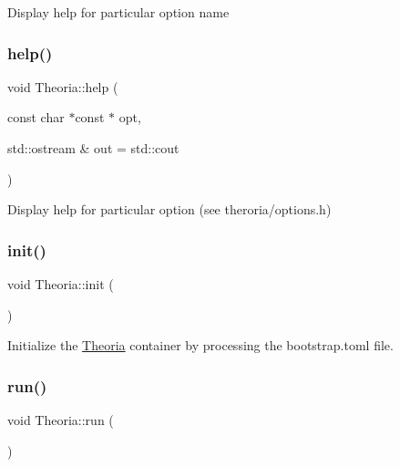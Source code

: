 Display help for particular option name \mbox{\label{classtheoria_1_1core_1_1Theoria_a6e8f92e0bc4cabe69a0675797d158b9f}} 
\subsubsection{\texorpdfstring{help()}{help()}\hspace{0.1cm}{\footnotesize\ttfamily [3/3]}}
{\footnotesize\ttfamily void Theoria\+::help (\begin{DoxyParamCaption}\item[{const char $\ast$const $\ast$}]{opt,  }\item[{std\+::ostream \&}]{out = {\ttfamily std\+:\+:cout} }\end{DoxyParamCaption})}

Display help for particular option (see theroria/options.\+h) \mbox{\label{classtheoria_1_1core_1_1Theoria_a7c08abec5d2655e8779f81622406ccb7}} 
\subsubsection{\texorpdfstring{init()}{init()}}
{\footnotesize\ttfamily void Theoria\+::init (\begin{DoxyParamCaption}{ }\end{DoxyParamCaption})}

Initialize the \hyperlink{classtheoria_1_1core_1_1Theoria}{Theoria} container by processing the bootstrap.\+toml file. \mbox{\label{classtheoria_1_1core_1_1Theoria_a2792aa50eb3ec9a2bea5288097052a3f}} 
\subsubsection{\texorpdfstring{run()}{run()}}
{\footnotesize\ttfamily void Theoria\+::run (\begin{DoxyParamCaption}{ }\end{DoxyParamCaption})}

